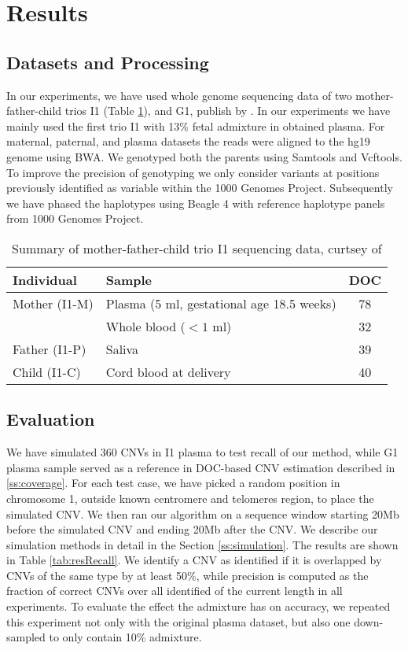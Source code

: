 \section{Results}

\subsection{Datasets and Processing}
\label{data}
In our experiments, we have used whole genome sequencing data of two mother-father-child trios I1 (Table \ref{tab:I1}), and G1, publish by \cite{kitzman2012}. In our experiments we have mainly used the first trio I1 with 13\% fetal admixture in obtained plasma. For maternal, paternal, and plasma datasets the reads were aligned to the hg19 genome using BWA. We genotyped both the parents using Samtools and Vcftools. To improve the precision of genotyping we only consider variants at positions previously identified as variable within the 1000 Genomes Project.  Subsequently we have phased the haplotypes using Beagle 4 \cite{browning2013} with reference haplotype panels from 1000 Genomes Project. 
\begin{table}[t]
\centering
\begin{tabular}{l|l|c}
Individual & Sample & DOC \\ \hline
Mother (I1-M) & Plasma (5 ml, gestational age 18.5 weeks) & 78 \\
	& Whole blood ($<1$ ml) & 32 \\
Father (I1-P) & Saliva & 39 \\
Child (I1-C) & Cord blood at delivery & 40
\end{tabular}
\vspace{3pt}
\caption{Summary of mother-father-child trio I1 sequencing data, curtsey of \cite{kitzman2012}  }
\label{tab:I1} 
\end{table}

\subsection{Evaluation}
We have simulated 360 CNVs in I1 plasma to test recall of our method, while G1 plasma sample served as a reference in DOC-based CNV estimation described in \ref{ss:coverage}. For each test case, we have picked a random position in chromosome 1, outside known centromere and telomeres region, to place the simulated CNV.  We then ran our algorithm on a sequence window starting 20Mb before the simulated CNV and ending 20Mb after the CNV.  We describe our simulation methods in detail in the Section \ref{ss:simulation}. The results are shown in Table \ref{tab:resRecall}. We identify a CNV as identified if it is overlapped by CNVs of the same type by at least 50\%, while precision is computed as the fraction of correct CNVs over all identified of the current length in all experiments. To evaluate the effect the admixture has on accuracy, we repeated this experiment not only with the original plasma dataset, but also one down-sampled to only contain 10\% admixture. 

